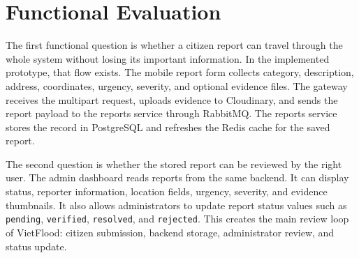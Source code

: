 \section{Functional Evaluation}

The first functional question is whether a citizen report can travel through the whole system without losing its important information. In the implemented prototype, that flow exists. The mobile report form collects category, description, address, coordinates, urgency, severity, and optional evidence files. The gateway receives the multipart request, uploads evidence to Cloudinary, and sends the report payload to the reports service through RabbitMQ. The reports service stores the record in PostgreSQL and refreshes the Redis cache for the saved report.

The second question is whether the stored report can be reviewed by the right user. The admin dashboard reads reports from the same backend. It can display status, reporter information, location fields, urgency, severity, and evidence thumbnails. It also allows administrators to update report status values such as \texttt{pending}, \texttt{verified}, \texttt{resolved}, and \texttt{rejected}. This creates the main review loop of VietFlood: citizen submission, backend storage, administrator review, and status update.

